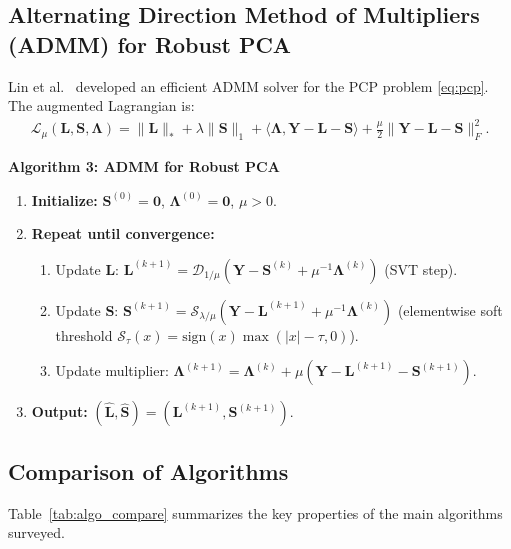 \documentclass[conference]{IEEEtran}
\begin{document}
\subsection{Alternating Direction Method of Multipliers (ADMM) for Robust PCA}

Lin et al.\ \cite{lin2010augmented} developed an efficient ADMM solver for the PCP problem \eqref{eq:pcp}. The augmented Lagrangian is:
\begin{align}
  \mathcal{L}_\mu(\mathbf{L}, \mathbf{S}, \boldsymbol{\Lambda}) = \|\mathbf{L}\|_* + \lambda\|\mathbf{S}\|_1 + \langle \boldsymbol{\Lambda}, \mathbf{Y} - \mathbf{L} - \mathbf{S} \rangle + \frac{\mu}{2}\|\mathbf{Y} - \mathbf{L} - \mathbf{S}\|_F^2.
\end{align}

\textbf{Algorithm 3: ADMM for Robust PCA}
\begin{enumerate}
  \item \textbf{Initialize:} $\mathbf{S}^{(0)} = \mathbf{0}$, $\boldsymbol{\Lambda}^{(0)} = \mathbf{0}$, $\mu > 0$.
  \item \textbf{Repeat until convergence:}
    \begin{enumerate}
      \item Update $\mathbf{L}$: $\mathbf{L}^{(k+1)} = \mathcal{D}_{1/\mu}(\mathbf{Y} - \mathbf{S}^{(k)} + \mu^{-1}\boldsymbol{\Lambda}^{(k)})$ (SVT step).
      \item Update $\mathbf{S}$: $\mathbf{S}^{(k+1)} = \mathcal{S}_{\lambda/\mu}(\mathbf{Y} - \mathbf{L}^{(k+1)} + \mu^{-1}\boldsymbol{\Lambda}^{(k)})$ (elementwise soft threshold $\mathcal{S}_\tau(x) = \mathrm{sign}(x)\max(|x|-\tau,0)$).
      \item Update multiplier: $\boldsymbol{\Lambda}^{(k+1)} = \boldsymbol{\Lambda}^{(k)} + \mu(\mathbf{Y} - \mathbf{L}^{(k+1)} - \mathbf{S}^{(k+1)})$.
    \end{enumerate}
  \item \textbf{Output:} $(\hat{\mathbf{L}}, \hat{\mathbf{S}}) = (\mathbf{L}^{(k+1)}, \mathbf{S}^{(k+1)})$.
\end{enumerate}

\subsection{Comparison of Algorithms}

Table~\ref{tab:algo_compare} summarizes the key properties of the main algorithms surveyed.
\end{document}
